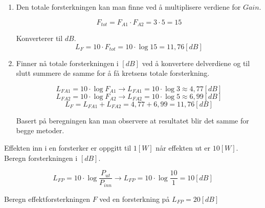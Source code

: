 \begin{solution}[name=Løsningsforslag oppgave]
	\begin{enumerate}[label=\roman*)]
		\item Den totale forsterkningen kan man finne ved å multiplisere verdiene for $Gain$.

\[F_{tot}=F_{A1} \cdot F_{A2}= 3 \cdot 5 = 15\]

Konverterer til $dB$.
\[L_F=10 \cdot F_{tot} = 10 \cdot \log 15 = 11,76[dB]\]

	\item Finner nå totale forsterkningen i $[dB]$ ved å konvertere delverdiene og til slutt summere de samme for å få kretsens totale forsterkning.

\[L_{FA1}=10\cdot \log F_{A1} \rightarrow L_{FA1}=10 \cdot \log 3 \approx 4,77 [dB]\]
\[L_{FA2}=10 \cdot \log F_{A2} \rightarrow L_{FA2}=10 \cdot \log 5 \approx 6,99 [dB]\]
\[L_F = L_{FA1}+L_{FA2} = 4,77+6,99 = 11,76 [dB]\]

Basert på beregningen kan man observere at resultatet blir det samme for begge metoder.

	\end{enumerate}

\end{solution}
\vspace{0.5cm} %


\begin{question}[name=Oppgave, topic=forsterkning]
Effekten inn i en forsterker er oppgitt til $1[W]$ når effekten ut er $10[W]$. Beregn forsterkningen i $[dB]$.
\end{question}

\vspace{0.5cm} %

\begin{solution}[name=Løsningsforslag oppgave]
\[L_{FP}=10\cdot \log \frac{P_{ut}}{P_{inn}} \rightarrow L_{FP}=10 \cdot \log\frac{10}{1}=10[dB]\]

\end{solution}


\vspace{0.5cm} %

\begin{question}[name=Oppgave, topic=forsterkning]
Beregn effektforsterkningen $F$ ved en forsterkning på $L_{FP}=20[dB]$
\end{question}

\vspace{0.5cm} %

